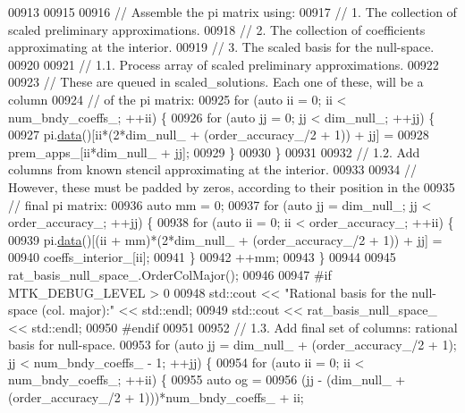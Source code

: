 \begin{DoxyCode}
{{00913 
00915 
00916   \textcolor{comment}{// Assemble the pi matrix using:}
00917   \textcolor{comment}{// 1. The collection of scaled preliminary approximations.}
00918   \textcolor{comment}{// 2. The collection of coefficients approximating at the interior.}
00919   \textcolor{comment}{// 3. The scaled basis for the null-space.}
00920 
00921   \textcolor{comment}{// 1.1. Process array of scaled preliminary approximations.}
00922 
00923   \textcolor{comment}{// These are queued in scaled\_solutions. Each one of these, will be a column}
00924   \textcolor{comment}{// of the pi matrix:}
00925   \textcolor{keywordflow}{for} (\textcolor{keyword}{auto} ii = 0; ii < num\_bndy\_coeffs\_; ++ii) \{
00926     \textcolor{keywordflow}{for} (\textcolor{keyword}{auto} jj = 0; jj < dim\_null\_; ++jj) \{
00927       pi.\hyperlink{classmtk_1_1DenseMatrix_a16b3ff56feb2658b9fc7147d1de4d8e7}{data}()[ii*(2*dim\_null\_ + (order\_accuracy\_/2 + 1)) + jj] =
00928         prem\_apps\_[ii*dim\_null\_ + jj];
00929     \}
00930   \}
00931 
00932   \textcolor{comment}{// 1.2. Add columns from known stencil approximating at the interior.}
00933 
00934   \textcolor{comment}{// However, these must be padded by zeros, according to their position in the}
00935   \textcolor{comment}{// final pi matrix:}
00936   \textcolor{keyword}{auto} mm = 0;
00937   \textcolor{keywordflow}{for} (\textcolor{keyword}{auto} jj = dim\_null\_; jj < order\_accuracy\_; ++jj) \{
00938     \textcolor{keywordflow}{for} (\textcolor{keyword}{auto} ii = 0; ii < order\_accuracy\_; ++ii) \{
00939       pi.\hyperlink{classmtk_1_1DenseMatrix_a16b3ff56feb2658b9fc7147d1de4d8e7}{data}()[(ii + mm)*(2*dim\_null\_ + (order\_accuracy\_/2 + 1)) + jj] =
00940         coeffs\_interior\_[ii];
00941     \}
00942     ++mm;
00943   \}
00944 
00945   rat\_basis\_null\_space\_.OrderColMajor();
00946 
00947 \textcolor{preprocessor}{  #if MTK\_DEBUG\_LEVEL > 0}
00948   std::cout << \textcolor{stringliteral}{"Rational basis for the null-space (col. major):"} << std::endl;
00949   std::cout << rat\_basis\_null\_space\_ << std::endl;
00950 \textcolor{preprocessor}{  #endif}
00951 
00952   \textcolor{comment}{// 1.3. Add final set of columns: rational basis for null-space.}
00953   \textcolor{keywordflow}{for} (\textcolor{keyword}{auto} jj = dim\_null\_ + (order\_accuracy\_/2 + 1); jj < num\_bndy\_coeffs\_ - 1; ++jj) \{
00954     \textcolor{keywordflow}{for} (\textcolor{keyword}{auto} ii = 0; ii < num\_bndy\_coeffs\_; ++ii) \{
00955       \textcolor{keyword}{auto} og =
00956         (jj - (dim\_null\_ + (order\_accuracy\_/2 + 1)))*num\_bndy\_coeffs\_ + ii;
}}
\end{DoxyCode}
